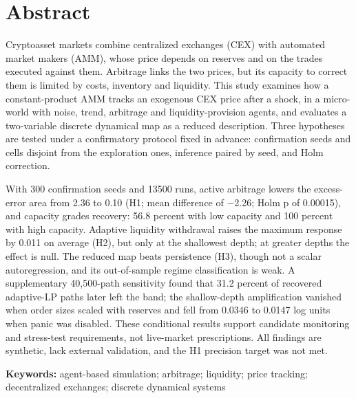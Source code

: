 \section{Abstract}

Cryptoasset markets combine centralized exchanges (CEX) with automated market makers (AMM), whose price depends on reserves and on the trades executed against them. Arbitrage links the two prices, but its capacity to correct them is limited by costs, inventory and liquidity. This study examines how a constant-product AMM tracks an exogenous CEX price after a shock, in a micro-world with noise, trend, arbitrage and liquidity-provision agents, and evaluates a two-variable discrete dynamical map as a reduced description. Three hypotheses are tested under a confirmatory protocol fixed in advance: confirmation seeds and cells disjoint from the exploration ones, inference paired by seed, and Holm correction.

With 300 confirmation seeds and 13500 runs, active arbitrage lowers the excess-error area from 2.36 to 0.10 (H1; mean difference of −2.26; Holm p of 0.00015), and capacity grades recovery: 56.8 percent with low capacity and 100 percent with high capacity. Adaptive liquidity withdrawal raises the maximum response by 0.011 on average (H2), but only at the shallowest depth; at greater depths the effect is null. The reduced map beats persistence (H3), though not a scalar autoregression, and its out-of-sample regime classification is weak. A supplementary 40,500-path sensitivity found that 31.2 percent of recovered adaptive-LP paths later left the band; the shallow-depth amplification vanished when order sizes scaled with reserves and fell from 0.0346 to 0.0147 log units when panic was disabled. These conditional results support candidate monitoring and stress-test requirements, not live-market prescriptions. All findings are synthetic, lack external validation, and the H1 precision target was not met.

\textbf{Keywords:} agent-based simulation; arbitrage; liquidity; price tracking; decentralized exchanges; discrete dynamical systems
